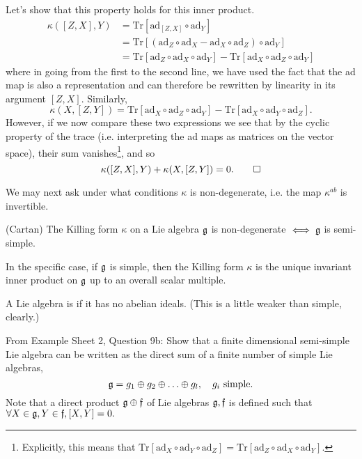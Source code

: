 Let's show that this property holds for this inner product.
\begin{align*}
\kappa([Z,X],Y) &=\text{Tr}[\text{ad}_{[Z,X]}\circ \text{ad}_Y]\\
&=\text{Tr}[(\text{ad}_Z \circ \text{ad}_X - \text{ad}_X \circ \text{ad}_Z)\circ \text{ad}_Y]\\
&=\text{Tr}[\text{ad}_Z \circ \text{ad}_X \circ \text{ad}_Y] - \text{Tr}[\text{ad}_X \circ \text{ad}_Z \circ \text{ad}_Y]
\end{align*}
where in going from the first to the second line, we have used the fact that the ad map is also a representation and can therefore be rewritten by linearity in its argument $[Z,X]$.
Similarly,
$$\kappa(X,[Z,Y])=\text{Tr}[\text{ad}_X\circ \text{ad}_Z \circ \text{ad}_Y]-\text{Tr}[\text{ad}_X \circ \text{ad}_Y \circ \text{ad}_Z].$$
However, if we now compare these two expressions we see that by the cyclic property of the trace (i.e. interpreting the ad maps as matrices on the vector space), their sum vanishes\footnote{Explicitly, this means that $\text{Tr}[\text{ad}_X \circ \text{ad}_Y \circ \text{ad}_Z]=\text{Tr}[\text{ad}_Z \circ \text{ad}_X \circ \text{ad}_Y]$.}, and so
$$\kappa([Z,X],Y)+\kappa(X,[Z,Y])=0. \qed$$

We may next ask under what conditions $\kappa$ is non-degenerate, i.e. the map $\kappa^{ab}$ is invertible. 
\begin{thm}
(Cartan) The Killing form $\kappa$ on a Lie algebra $\mathfrak{g}$ is non-degenerate $\iff \mathfrak{g}$ is semi-simple.
\end{thm}
In the specific case, if $\mathfrak{g}$ is simple, then the Killing form $\kappa$ is the unique invariant inner product on $\mathfrak{g}$ up to an overall scalar multiple.
\begin{defn}
A Lie algebra is  if it has no abelian ideals. (This is a little weaker than simple, clearly.)
\end{defn}
\begin{ex}
From Example Sheet 2, Question 9b: Show that a finite dimensional semi-simple Lie algebra can be written as the direct sum of a finite number of simple Lie algebras,
$$\mathfrak{g} = g_1\oplus g_2 \oplus \ldots \oplus g_l, \quad g_i\text{ simple}.$$
Note that a direct product $\mathfrak{g} \oplus \mathfrak{f}$ of Lie algebras $\mathfrak{g},\mathfrak{f}$ is defined such that $\forall X\in \mathfrak{g}, Y \in \mathfrak{f}, [X,Y]=0.$
\end{ex}

